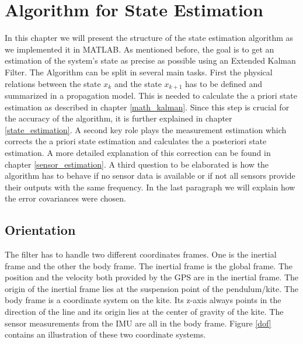 \section{Algorithm for State Estimation}
In this chapter we will present the structure of the state estimation algorithm as we implemented it in MATLAB. As mentioned before, the goal is to get an estimation of the system's state as precise as possible using an Extended Kalman Filter. The Algorithm can be split in several main tasks. First the physical relations between the state $x_{k}$ and the state $x_{k+1}$ has to be defined and summarized in a propagation model. This is needed to calculate the a priori state estimation as described in chapter \ref{math_kalman}. Since this step is  crucial for the accuracy of the algorithm, it is further explained in chapter \ref{state_estimation}. A second key role plays the measurement estimation which corrects the a priori state estimation and calculates the a posteriori state estimation. A more detailed explanation of this correction can be found in chapter \ref{sensor_estimation}. A third question to be elaborated is how the algorithm has to behave if no sensor data is available or if not all sensors provide their outputs with the same frequency. In the last paragraph we will explain how the error covariances were chosen.

\subsection*{Orientation}
The filter has to handle two different coordinates frames. One is the inertial frame and the other the body frame. The inertial frame is the global frame. The position and the velocity both provided by the GPS are in the inertial frame. The origin of the inertial frame lies at the suspension point of the pendulum/kite. The body frame is a coordinate system on the kite. Its z-axis always points in the direction of the line and its origin lies at the center of gravity of the kite. The sensor measurements from the IMU are all in the body frame. Figure \ref{dof} contains an illustration of these two coordinate systems. 

